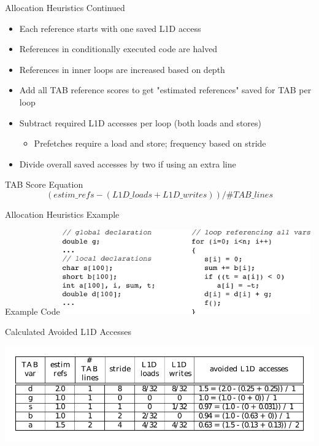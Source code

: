 \documentclass{beamer}
\begin{document}
\begin{frame}{Allocation Heuristics Continued}
   \begin{itemize}
      \item Each reference starts with one saved L1D access
      \item References in conditionally executed code are halved
      \item References in inner loops are increased based on depth
      \item Add all TAB reference scores to get "estimated references" 
         saved for TAB per loop
      \item Subtract required L1D accesses per loop (both loads and stores)
         \begin{itemize}
            \item Prefetches require a load and store; frequency based on stride
         \end{itemize}
      \item Divide overall saved accesses by two if using an extra line
   \end{itemize}
   \begin{block}{TAB Score Equation}
      \begin{equation}
         (estim\_refs - (L1D\_loads + L1D\_writes)) / \#TAB\_lines
      \end{equation}
   \end{block}
\end{frame}
\begin{frame}{Allocation Heuristics Example}
   \vspace{-0.35cm}
   \begin{block}{Example Code}
      \includegraphics[width=0.80\textwidth]{figures/estimationexample_horizontal.pdf}
   \end{block}
   \vspace{-0.25cm}
   \begin{block}{Calculated Avoided L1D Accesses}
      \begin{center}
         \vspace{-0.35cm}
         \includegraphics[width=1.0\textwidth]{figures/estimationtable.pdf}
         \vspace{-0.35cm}
      \end{center}
   \end{block}
\end{frame}
\end{document}

